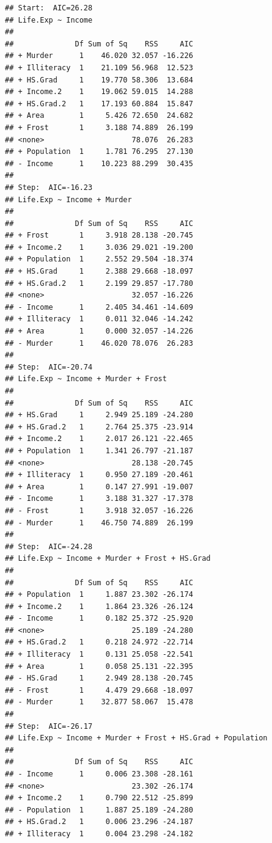 \documentclass[]{book}
\theoremstyle{definition}
\theoremstyle{definition}
\theoremstyle{remark}
\begin{document}
\begin{verbatim}
## Start:  AIC=26.28
## Life.Exp ~ Income
## 
##              Df Sum of Sq    RSS     AIC
## + Murder      1    46.020 32.057 -16.226
## + Illiteracy  1    21.109 56.968  12.523
## + HS.Grad     1    19.770 58.306  13.684
## + Income.2    1    19.062 59.015  14.288
## + HS.Grad.2   1    17.193 60.884  15.847
## + Area        1     5.426 72.650  24.682
## + Frost       1     3.188 74.889  26.199
## <none>                    78.076  26.283
## + Population  1     1.781 76.295  27.130
## - Income      1    10.223 88.299  30.435
## 
## Step:  AIC=-16.23
## Life.Exp ~ Income + Murder
## 
##              Df Sum of Sq    RSS     AIC
## + Frost       1     3.918 28.138 -20.745
## + Income.2    1     3.036 29.021 -19.200
## + Population  1     2.552 29.504 -18.374
## + HS.Grad     1     2.388 29.668 -18.097
## + HS.Grad.2   1     2.199 29.857 -17.780
## <none>                    32.057 -16.226
## - Income      1     2.405 34.461 -14.609
## + Illiteracy  1     0.011 32.046 -14.242
## + Area        1     0.000 32.057 -14.226
## - Murder      1    46.020 78.076  26.283
## 
## Step:  AIC=-20.74
## Life.Exp ~ Income + Murder + Frost
## 
##              Df Sum of Sq    RSS     AIC
## + HS.Grad     1     2.949 25.189 -24.280
## + HS.Grad.2   1     2.764 25.375 -23.914
## + Income.2    1     2.017 26.121 -22.465
## + Population  1     1.341 26.797 -21.187
## <none>                    28.138 -20.745
## + Illiteracy  1     0.950 27.189 -20.461
## + Area        1     0.147 27.991 -19.007
## - Income      1     3.188 31.327 -17.378
## - Frost       1     3.918 32.057 -16.226
## - Murder      1    46.750 74.889  26.199
## 
## Step:  AIC=-24.28
## Life.Exp ~ Income + Murder + Frost + HS.Grad
## 
##              Df Sum of Sq    RSS     AIC
## + Population  1     1.887 23.302 -26.174
## + Income.2    1     1.864 23.326 -26.124
## - Income      1     0.182 25.372 -25.920
## <none>                    25.189 -24.280
## + HS.Grad.2   1     0.218 24.972 -22.714
## + Illiteracy  1     0.131 25.058 -22.541
## + Area        1     0.058 25.131 -22.395
## - HS.Grad     1     2.949 28.138 -20.745
## - Frost       1     4.479 29.668 -18.097
## - Murder      1    32.877 58.067  15.478
## 
## Step:  AIC=-26.17
## Life.Exp ~ Income + Murder + Frost + HS.Grad + Population
## 
##              Df Sum of Sq    RSS     AIC
## - Income      1     0.006 23.308 -28.161
## <none>                    23.302 -26.174
## + Income.2    1     0.790 22.512 -25.899
## - Population  1     1.887 25.189 -24.280
## + HS.Grad.2   1     0.006 23.296 -24.187
## + Illiteracy  1     0.004 23.298 -24.182

\end{verbatim}
\end{document}
